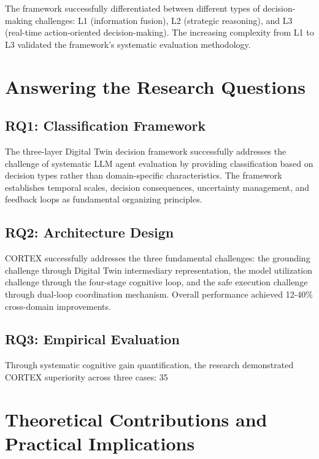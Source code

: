 The framework successfully differentiated between different types of decision-making challenges: L1 (information fusion), L2 (strategic reasoning), and L3 (real-time action-oriented decision-making). The increasing complexity from L1 to L3 validated the framework's systematic evaluation methodology.

\section{Answering the Research Questions}

\subsection{RQ1: Classification Framework}

The three-layer Digital Twin decision framework successfully addresses the challenge of systematic LLM agent evaluation by providing classification based on decision types rather than domain-specific characteristics. The framework establishes temporal scales, decision consequences, uncertainty management, and feedback loops as fundamental organizing principles.

\subsection{RQ2: Architecture Design}

CORTEX successfully addresses the three fundamental challenges: the grounding challenge through Digital Twin intermediary representation, the model utilization challenge through the four-stage cognitive loop, and the safe execution challenge through dual-loop coordination mechanism. Overall performance achieved 12-40\% cross-domain improvements.

\subsection{RQ3: Empirical Evaluation}

Through systematic cognitive gain quantification, the research demonstrated CORTEX superiority across three cases: 35%

\section{Theoretical Contributions and Practical Implications}

